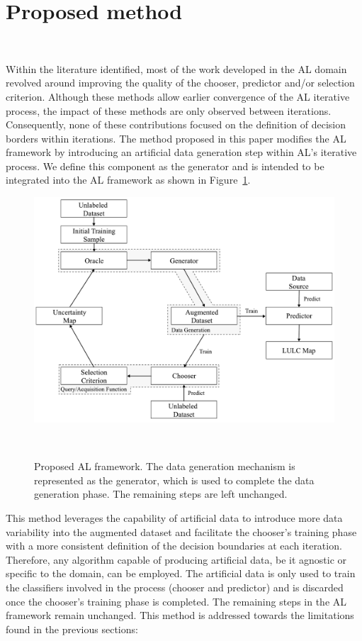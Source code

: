 \documentclass[parskip=full]{scrartcl}
\begin{document}
\section{Proposed method}~\label{sec:proposed-method}

Within the literature identified, most of the work developed in the AL domain
revolved around improving the quality of the chooser, predictor and/or
selection criterion. Although these methods allow earlier convergence of the AL
iterative process, the impact of these methods are only observed between
iterations. Consequently, none of these contributions focused on the
definition of decision borders within iterations. The method proposed in this
paper modifies the AL framework by introducing an artificial data generation
step within AL's iterative process. We define this component as the generator
and is intended to be integrated into the AL framework as shown in
Figure~\ref{fig:al_new}. 

\begin{figure}[htb]
	\centering
	\includegraphics[width=.85\linewidth]{../analysis/al_new}
    \caption{Proposed AL framework. The data generation mechanism is
        represented as the generator, which is used to complete the data
        generation phase. The remaining steps are left unchanged.
    }~\label{fig:al_new}
\end{figure}

This method leverages the capability of artificial data to introduce more data
variability into the augmented dataset and facilitate the chooser's training
phase with a more consistent definition of the decision boundaries at each
iteration. Therefore, any algorithm capable of producing artificial data, be
it agnostic or specific to the domain, can be employed. The artificial data is
only used to train the classifiers involved in the process (chooser and
predictor) and is discarded once the chooser's training phase is completed.
The remaining steps in the AL framework remain unchanged. This method is
addressed towards the limitations found in the previous sections: 
\end{document}
